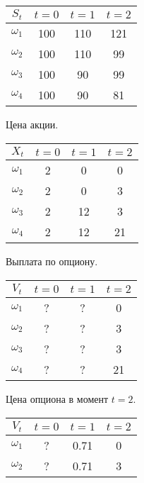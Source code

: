 \begin{example}
\begin{figure}[h]
\centering
\begin{subfigure}{0.45\textwidth}
  \centering
  \begin{tabular}{c|ccc}
    $S_t$ & $t=0$ & $t=1$ & $t=2$\\\hline
    $\omega_1$ & 100 &110 &121\\
    $\omega_2$ & 100 &110 &99\\
    $\omega_3$ & 100 &90 &99\\
    $\omega_4$ & 100 &90 &81\\
  \end{tabular}
  \caption{Цена акции.}
  \label{5:fig-put-price-0}
\end{subfigure}
%
\begin{subfigure}{0.45\textwidth}
  \centering
  \begin{tabular}{c|ccc}
    $X_t$ & $t=0$ & $t=1$ & $t=2$\\\hline
    $\omega_1$ & 2 &0 &0\\
    $\omega_2$ & 2 &0 &3\\
    $\omega_3$ & 2 &12 &3\\
    $\omega_4$ & 2 &12 &21\\
  \end{tabular}
  \caption{Выплата по опциону.}
  \label{5:fig-put-price-1}
\end{subfigure}
\par\vspace{5mm}\par
\begin{subfigure}{0.45\textwidth}
  \centering
  \begin{tabular}{c|ccc}
    $V_t$ & $t=0$ & $t=1$ & $t=2$\\\hline
    $\omega_1$ & ? &? &0\\
    $\omega_2$ & ? &? &3\\
    $\omega_3$ & ? &? &3\\
    $\omega_4$ & ? &? &21\\
  \end{tabular}
  \caption{Цена опциона в момент $t=2$.}
  \label{5:fig-put-price-2}
\end{subfigure}
%
\begin{subfigure}{0.45\textwidth}
  \centering
  \begin{tabular}{c|ccc}
    $V_t$ & $t=0$ & $t=1$ & $t=2$\\\hline
    $\omega_1$ & ? &0.71 &0\\
    $\omega_2$ & ? &0.71 &3\\

\end{tabular}
\end{subfigure}
\end{figure}
\end{example}
